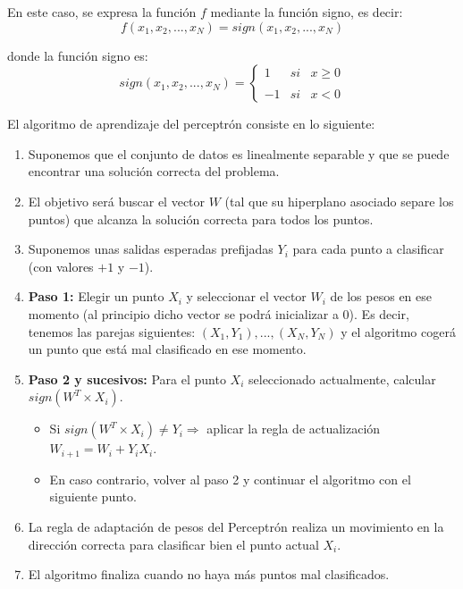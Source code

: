 \documentclass[a4paper, 11pt]{article} %
\begin{document}
En este caso, se expresa la función $f$ mediante la función signo, es decir:
\[
f(x_1, x_2, ..., x_N) = sign(x_1, x_2, ..., x_N)
\]

donde la función signo es:
\[
sign(x_1, x_2, ..., x_N) = \left\{ \begin{array}{lcc}
             1 &   si  & x \geq 0 \\
             \\ -1 &  si  &  x < 0 
             \end{array}
   \right.
\]

El algoritmo de aprendizaje del perceptrón consiste en lo siguiente:
\begin{enumerate}
    \item Suponemos que el conjunto de datos es linealmente separable y que se puede encontrar una solución correcta del problema.
    \item El objetivo será buscar el vector $W$ (tal que su hiperplano asociado separe los puntos) que alcanza la solución correcta para todos los puntos.
    \item Suponemos unas salidas esperadas prefijadas $Y_i$ para cada punto a clasificar (con valores $+1$ y $-1$).
    \item \textbf{Paso 1:} Elegir un punto $X_i$ y seleccionar el vector $W_i$ de los pesos en ese momento (al principio dicho vector se podrá inicializar a $0$). Es decir, tenemos las parejas siguientes: ${(X_1, Y_1), ..., (X_N, Y_N)}$ y el algoritmo cogerá un punto que está mal clasificado en ese momento.
    \item \textbf{Paso 2 y sucesivos:} Para el punto $X_i$ seleccionado actualmente, calcular $sign(W^T \times X_i)$.
    \begin{itemize}
        \item Si $sign(W^T \times X_i) \neq Y_i \Rightarrow$ aplicar la regla de actualización $W_{i+1} = W_i + Y_iX_i$.
        \item En caso contrario, volver al paso 2 y continuar el algoritmo con el siguiente punto.
    \end{itemize}
    \item La regla de adaptación de pesos del Perceptrón realiza un movimiento en la dirección correcta para clasificar bien el punto actual $X_i$.
    \item El algoritmo finaliza cuando no haya más puntos mal clasificados.
\end{enumerate}
\end{document}
